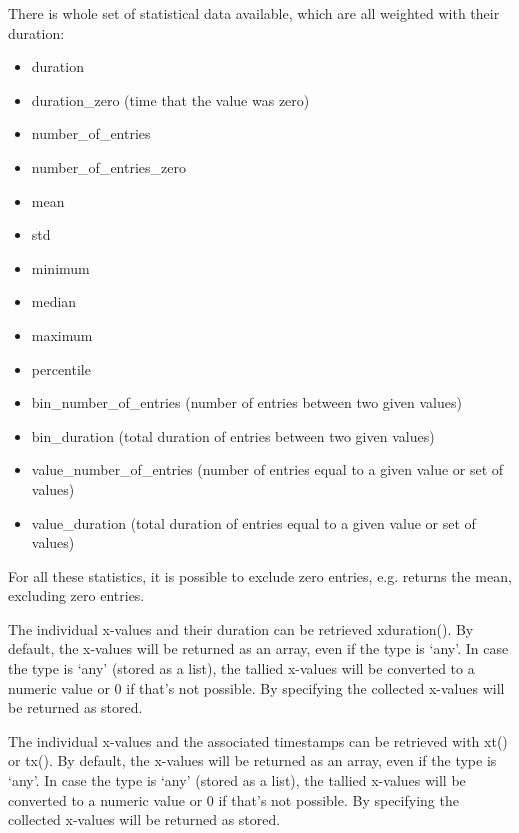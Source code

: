 \documentclass[letterpaper,10pt,english]{sphinxmanual}
\begin{document}
There is whole set of statistical data available, which are all weighted with their duration:
\begin{itemize}
\item {} 
duration

\item {} 
duration\_zero (time that the value was zero)

\item {} 
number\_of\_entries

\item {} 
number\_of\_entries\_zero

\item {} 
mean

\item {} 
std

\item {} 
minimum

\item {} 
median

\item {} 
maximum

\item {} 
percentile

\item {} 
bin\_number\_of\_entries (number of entries between two given values)

\item {} 
bin\_duration (total duration of entries between two given values)

\item {} 
value\_number\_of\_entries (number of entries equal to a given value or set of values)

\item {} 
value\_duration (total duration of entries equal to a given value or set of values)

\end{itemize}

For all these statistics, it is possible to exclude zero entries, e.g.  returns the mean, excluding zero entries.

The individual x-values and their duration can be retrieved xduration(). By default, the x-values will be returned as an array, even if
the type is ‘any’. In case the type is ‘any’ (stored as a list), the tallied x-values will be converted to a numeric value or 0 if
that’s not possible. By specifying  the collected x-values will be returned as stored.

The individual x-values and the associated timestamps can be retrieved with xt() or tx(). By default, the x-values will be returned as an array, even if
the type is ‘any’. In case the type is ‘any’ (stored as a list), the tallied x-values will be converted to a numeric value or 0 if
that’s not possible. By specifying  the collected x-values will be returned as stored.
\end{document}

